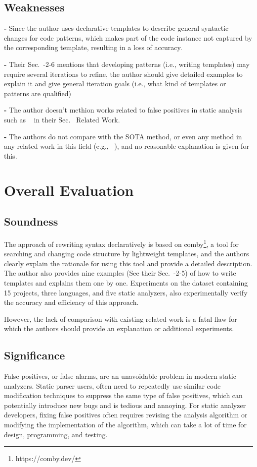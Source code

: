 \documentclass[conference]{IEEEtran}
\begin{document}
\subsection{Weaknesses}\label{sec:weakness}
\textbf{-} Since the author uses declarative templates to describe general syntactic changes for code patterns,  which makes part of the code instance not captured by the corresponding template, resulting in a loss of accuracy.

\textbf{-} Their Sec.~-2-6 mentions that developing patterns (i.e., writing templates) may require several iterations to refine, the author should give detailed examples to explain it and give general iteration goals (i.e., what kind of templates or patterns are qualified)

\textbf{-} The author doesn't methion works related to false positives in static analysis such as ~\cite{Laura:2016,Nathaniel:2007,Emanuelsson:2008} in their Sec.~ Related Work.

\textbf{-} The authors do not compare with the SOTA method, or even any method in any related work in this field (e.g., ~\cite{Muske:2015,Chimdyalwar:2015,Nguyen:2019}), and no reasonable explanation is given for this.

\section{Overall Evaluation}
\subsection{Soundness}
The approach of rewriting syntax declaratively is based on comby\footnote[1]{https://comby.dev/}, a tool for searching and changing code structure by lightweight templates, and the authors clearly explain the rationale for using this tool and provide a detailed description. The author also provides nine examples (See their Sec.~-2-5) of how to write templates and explains them one by one. Experiments on the dataset containing 15 projects, three languages, and five static analyzers, also experimentally verify the accuracy and efficiency of this approach. 

However, the lack of comparison with existing related work is a fatal flaw for which the authors should provide an explanation or additional experiments.

\subsection{Significance}
False positives, or false alarms, are an unavoidable problem in modern static analyzers. Static parser users, often need to repeatedly use similar code modification techniques to suppress the same type of false positives, which can potentially introduce new bugs and is tedious and annoying. For static analyzer developers, fixing false positives often requires revising the analysis algorithm or modifying the implementation of the algorithm, which can take a lot of time for design, programming, and testing. 
\end{document}
